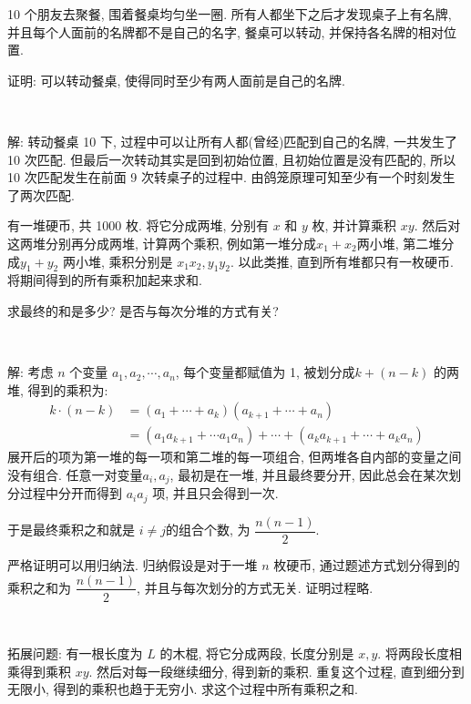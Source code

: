 \newpage
10 个朋友去聚餐, 围着餐桌均匀坐一圈. 所有人都坐下之后才发现桌子上有名牌, 并且每个人面前的名牌都不是自己的名字, 餐桌可以转动, 并保持各名牌的相对位置. 

证明: 可以转动餐桌, 使得同时至少有两人面前是自己的名牌.

~

解: 转动餐桌 10 下, 过程中可以让所有人都(曾经)匹配到自己的名牌, 一共发生了 10 次匹配. 但最后一次转动其实是回到初始位置, 且初始位置是没有匹配的, 所以 10 次匹配发生在前面 9 次转桌子的过程中. 由鸽笼原理可知至少有一个时刻发生了两次匹配.

\newpage
有一堆硬币, 共 1000 枚. 将它分成两堆, 分别有 $x$ 和 $y$ 枚, 并计算乘积 $xy$. 然后对这两堆分别再分成两堆, 计算两个乘积, 例如第一堆分成$x_1+x_2$两小堆, 第二堆分成$y_1+y_2$ 两小堆, 乘积分别是 $x_1x_2, y_1y_2$. 以此类推, 直到所有堆都只有一枚硬币. 将期间得到的所有乘积加起来求和. 

求最终的和是多少? 是否与每次分堆的方式有关?

~

解: 考虑 $n$ 个变量 $a_1, a_2, \cdots, a_n$, 每个变量都赋值为 1, 被划分成$k+(n-k)$ 的两堆, 得到的乘积为:
\begin{align*}
k\cdot(n-k) &=(a_1+\cdots+a_k)(a_{k+1}+\cdots+a_n) \\
& = (a_1a_{k+1}+\cdots a_1a_n)+\cdots+(a_ka_{k+1}+\cdots+a_ka_n)
\end{align*}
展开后的项为第一堆的每一项和第二堆的每一项组合, 但两堆各自内部的变量之间没有组合. 任意一对变量$a_i, a_j$, 最初是在一堆, 并且最终要分开, 因此总会在某次划分过程中分开而得到 $a_ia_j$ 项, 并且只会得到一次.

于是最终乘积之和就是 $i\neq j$的组合个数, 为 $\dfrac{n(n-1)}{2}$. 

严格证明可以用归纳法. 归纳假设是对于一堆 $n$ 枚硬币, 通过题述方式划分得到的乘积之和为 $\dfrac{n(n-1)}{2}$, 并且与每次划分的方式无关. 证明过程略.

~

拓展问题: 有一根长度为 $L$ 的木棍, 将它分成两段, 长度分别是 $x,y$. 将两段长度相乘得到乘积 $xy$. 然后对每一段继续细分, 得到新的乘积. 重复这个过程, 直到细分到无限小, 得到的乘积也趋于无穷小. 求这个过程中所有乘积之和.

